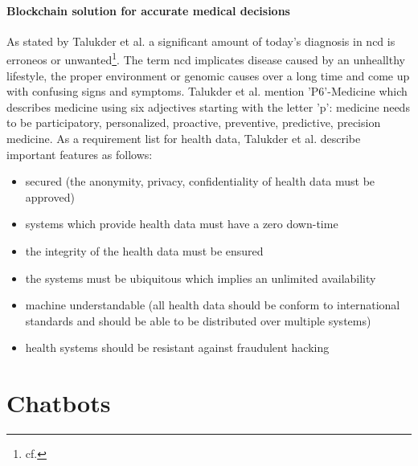 \paragraph{Blockchain solution for accurate medical decisions}
As stated by Talukder et al. a significant amount of today's diagnosis in \ac{ncd} is erroneos or unwanted\footnote{cf.\autocite{talukder}}. The term \ac{ncd} implicates disease caused by an unheallthy lifestyle, the proper environment or genomic causes over a long time and come up with confusing signs and symptoms.
Talukder et al. mention 'P6'-Medicine which describes medicine using six adjectives starting with the letter 'p': medicine needs to be participatory, personalized, proactive, preventive, predictive, precision medicine.
As a requirement list for health data, Talukder et al. describe important features as follows: 

\begin{itemize}
\setlength\itemsep{-0.5em}
  \item secured (the anonymity, privacy, confidentiality of health data must be approved)
  \item systems which provide health data must have a zero down-time 
  \item the integrity of the health data must be ensured
  \item the systems must be ubiquitous which implies an unlimited availability
  \item machine understandable (all health data should be conform to international standards and should be able to be distributed over multiple systems)
  \item health systems should be resistant against fraudulent hacking
\end{itemize}

\section{Chatbots} 

